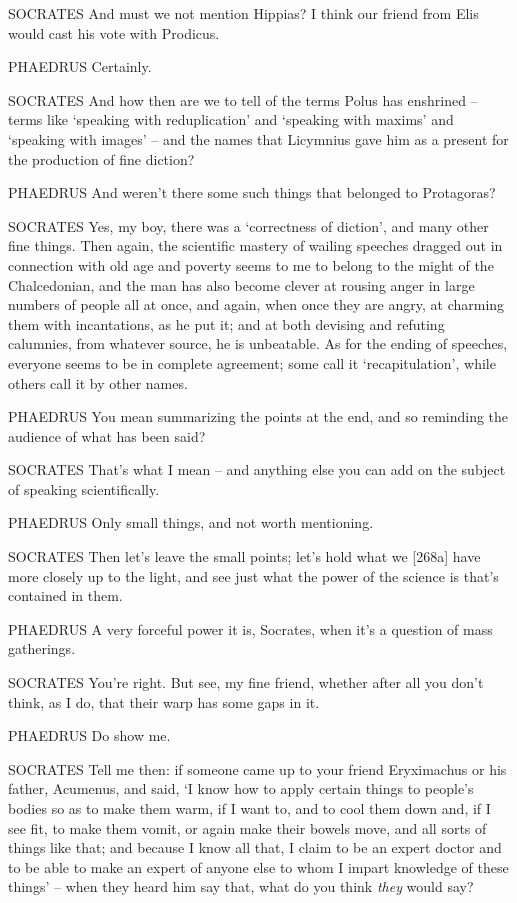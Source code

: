 SOCRATES And must we not mention Hippias? I think our friend from Elis
would cast his vote with Prodicus.

PHAEDRUS Certainly.

 SOCRATES And how then are we to tell of the terms Polus
 has enshrined -- terms like ‘speaking with reduplication' and
‘speaking with maxims' and ‘speaking with images' -- and the names that
Licymnius gave him as a present for the production of fine diction?

 PHAEDRUS And weren't there some such things that belonged to
Protagoras?

SOCRATES Yes, my boy, there was a ‘correctness of diction', and many
other fine things. Then again, the scientific mastery of wailing
speeches dragged out in connection with old age and poverty seems to me
to belong to the might of the
Chalcedonian, and the
man has also become clever at rousing anger in  large numbers of
people all at once, and again, when once they are angry, at charming
them with incantations, as he put it; and at both devising and refuting
calumnies, from whatever source, he is unbeatable. As for the ending of
speeches, everyone seems to be in complete agreement; some call it
‘recapitulation', while others call it by other names.

PHAEDRUS You mean summarizing the points at the end, and  so
reminding the audience of what has been said?

SOCRATES That's what I mean -- and anything else you can add on the
subject of speaking scientifically.

PHAEDRUS Only small things, and not worth mentioning.

SOCRATES Then let's leave the small points; let's hold what we
{[}268a{]} have more closely up to the light, and see just what the
power of the science is that's contained in them.

PHAEDRUS A very forceful power it is, Socrates, when it's a question of
mass gatherings.

SOCRATES You're right. But see, my fine friend, whether after 
all you don't think, as I do, that their warp has some gaps in it.

PHAEDRUS Do show me.

SOCRATES Tell me then: if someone came up to your friend Eryximachus or
his father, Acumenus,
and said, ‘I know how  to apply certain things to people's
bodies so as to make them warm, if I want to, and to cool them down and,
if I see fit, to  make them vomit, or again make their bowels
move, and all sorts of things like that; and because I know all that, I
claim to be an expert doctor and to be able to make an expert of anyone
else to whom I impart knowledge of these things' -- when they heard him
say that, what do you think {\em they} would say? 

